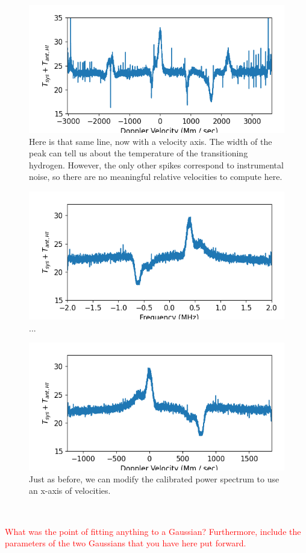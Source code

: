 \documentclass[12pt]{article}
\begin{document}
\begin{figure}
	\centering
	\includegraphics[width=.6\linewidth]{up_vs_vel}
	\caption{Here is that same line, now with a velocity axis. The width of the peak can tell us about the temperature of the transitioning hydrogen. However, the only other spikes correspond to instrumental noise, so there are no meaningful relative velocities to compute here.}
	\label{fig:up_vs_vel}
\end{figure}

\begin{figure}
\centering
	\includegraphics[width=.6\linewidth]{cass_vs_frq}
	\caption{...}
	\label{fig:cass_vs_frq}
\end{figure}

\begin{figure}
	\centering
	\includegraphics[width=.6\linewidth]{cass_vs_vel}
	\caption{Just as before, we can modify the calibrated power spectrum to use an x-axis of velocities. }
	\label{fig:cass_vs_vel}
\end{figure}

\

\textcolor{red}{What was the point of fitting anything to a Gaussian? Furthermore, include the parameters of the two Gaussians that you have here put forward.}
\end{document}
